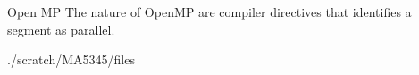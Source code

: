  Open MP 
 The nature of OpenMP are compiler directives that identifies a segment as parallel.  
 
 ./scratch/MA5345/files